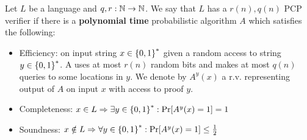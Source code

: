 \begin{definition}
	Let $L$ be a language and $q, r:\operatorname{\mathbb{N}} \to \operatorname{\mathbb{N}}$.
	We say that $L$  has a $r(n), q(n)$ PCP verifier if there is a \textbf{polynomial time} probabilistic algorithm $A$ which satisfies the following:
	\begin{itemize}
		\item Efficiency: on input string $x \in \operatorname{\{ 0, 1 \}}^{\ast}$ given a random access to string $y \in \operatorname{\{ 0, 1 \}}^{\ast}$. A uses at most $r(n)$ random bits and makes at most $q(n)$ queries to some locations in $y$.
		We denote by $A^y(x)$ a r.v. representing output of $A$ on input $x$ with access to proof $y$.
	\item Completeness: $x \in L \Rightarrow \exists y \in \operatorname{\{ 0, 1 \}}^{\ast}: \operatorname{Pr}[A^y(x) = 1] = 1$
	\item Soundness: $x \notin L \Rightarrow \forall y \in \operatorname{\{ 0, 1 \}}^{\ast}: \operatorname{Pr}[A^y(x) = 1] \leq \frac{1}{2}$
	\end{itemize}
\end{definition}
